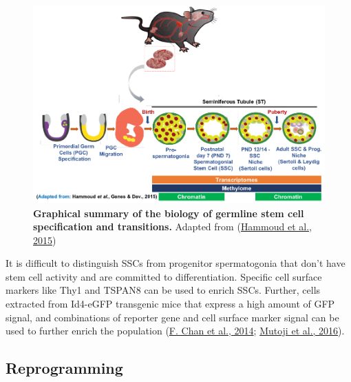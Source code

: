 \documentclass[12pt,twoside]{reedthesis}
\begin{document}
\begin{figure}[H]

{\centering \includegraphics{thesis_files/figure-latex/if2-1} 

}

\caption[Graphical summary of the biology of germline stem cell specification and transitions]{\textbf{Graphical summary of the biology of germline stem cell specification and transitions.} Adapted from (\protect\hyperlink{ref-hammoud2015}{Hammoud et al., 2015})}\label{fig:if2}
\end{figure}
It is difficult to distinguish SSCs from progenitor spermatogonia that
don't have stem cell activity and are committed to
differentiation. Specific cell surface markers like Thy1 and TSPAN8 can
be used to enrich SSCs. Further, cells extracted from Id4-eGFP
transgenic mice that express a high amount of GFP signal, and
combinations of reporter gene and cell surface marker signal can be used
to further enrich the population (\protect\hyperlink{ref-chan2014}{F. Chan et al., 2014}; \protect\hyperlink{ref-mutoji2016}{Mutoji et al., 2016}).

\hypertarget{reprogramming}{%
\subsection*{Reprogramming}\label{reprogramming}}
\end{document}
